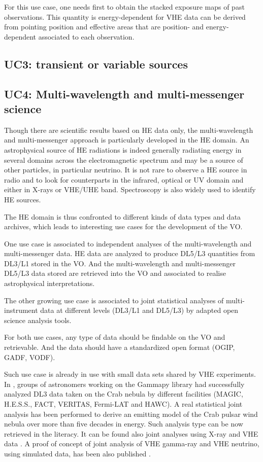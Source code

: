 \documentclass[11pt,a4paper]{ivoa}
\begin{document}
For this use case, one needs first to obtain the stacked exposure maps of past observations. This quantity is
energy-dependent for VHE data can be derived from pointing position and effective areas that are position- and energy-
dependent associated to each observation.


\subsection{UC3: transient or variable sources}




\subsection{UC4: Multi-wavelength and multi-messenger science}

Though there are scientific results based on HE data only, the multi-wavelength and multi-messenger approach is
particularly developed in the HE domain. An astrophysical source of HE radiations is indeed generally radiating
energy in several domains across the electromagnetic spectrum and may be a source of other particles, in particular
neutrino. It is not rare to observe a HE source in radio and to look for counterparts in the infrared, optical or UV
domain and either in X-rays or VHE/UHE band. Spectroscopy is also widely used to identify HE sources.

The HE domain is thus confronted to different kinds of data types and data archives, which leads to interesting use
cases for the development of the VO.

One use case is associated to independent analyses of the multi-wavelength and multi-messenger data. HE data are
analyzed to produce DL5/L3 quantities from DL3/L1 stored in the VO. And the multi-wavelength and multi-messenger
DL5/L3 data stored are retrieved into the VO and associated to realise astrophysical interpretations.

The other growing use case is associated to joint statistical analyses of multi-instrument data at different levels
(DL3/L1 and DL5/L3) by adapted open science analysis tools.

For both use cases, any type of data should be findable on the VO and retrievable. And the data should have a
standardized open format (OGIP, GADF, VODF).

Such use case is already in use with small data sets shared by VHE experiments. In
\citep{2019A&A...625A..10N, 2022A&A...667A..36A}, groups of astronomers working on the Gammapy library had successfully
analyzed DL3 data taken on the Crab nebula by different facilities (MAGIC, H.E.S.S., FACT, VERITAS, Fermi-LAT and HAWC).
A real statistical joint analysis has been performed to derive an emitting model of the Crab pulsar wind nebula over more
than five decades in energy. Such analysis type can be now retrieved in the literacy. It can be found also joint analyses
using X-ray and VHE data \citep{giunti2022}. A proof of concept of joint analysis of VHE gamma-ray and VHE neutrino,
using simulated data, has been also published \citep{unbehaun2024}.
\end{document}
